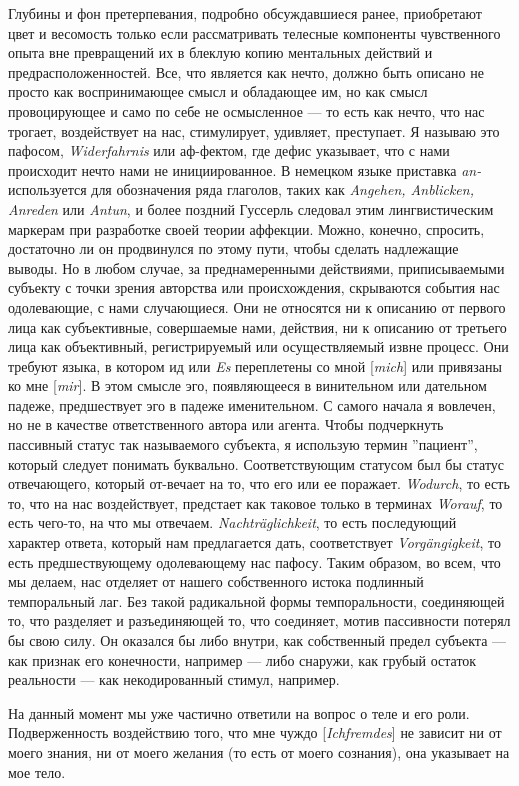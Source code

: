 \documentclass[12pt]{book}
\begin{document}
Глубины и фон претерпевания, подробно обсуждавшиеся ранее, приобретают цвет и весомость только если рассматривать телесные компоненты чувственного опыта вне превращений их в блеклую копию ментальных действий и предрасположенностей. Все, что является как нечто, должно быть описано не просто как воспринимающее смысл и обладающее им, но как смысл провоцирующее и само по себе не осмысленное --- то есть как нечто, что нас трогает, воздействует на нас, стимулирует, удивляет, преступает. Я называю это пафосом, \textit{Widerfahrnis} или аф-фектом, где дефис указывает, что с нами происходит нечто нами не инициированное. В немецком языке приставка \textit{an-} используется для обозначения ряда глаголов, таких как \textit{Angehen, Anblicken, Anreden} или \textit{Antun}, и более поздний Гуссерль следовал этим лингвистическим маркерам при разработке своей теории аффекции. Можно, конечно, спросить, достаточно ли он продвинулся по этому пути, чтобы сделать надлежащие выводы. Но в любом случае, за преднамеренными действиями, приписываемыми субъекту с точки зрения авторства или происхождения, скрываются события нас одолевающие, с нами случающиеся. Они не относятся ни к описанию от первого лица как субъективные, совершаемые нами, действия, ни к описанию от третьего лица как объективный, регистрируемый или осуществляемый извне процесс. Они требуют языка, в котором ид или \textit{Es} переплетены со мной [\textit{mich}] или привязаны ко мне [\textit{mir}]. В этом смысле эго, появляющееся в винительном или дательном падеже, предшествует эго в падеже именительном. С самого начала я вовлечен, но не в качестве ответственного автора или агента. Чтобы подчеркнуть пассивный статус так называемого субъекта, я использую термин ''пациент'', который следует понимать буквально. Соответствующим статусом был бы статус отвечающего, который от-вечает на то, что его или ее поражает. \textit{Wodurch}, то есть то, что на нас воздействует, предстает как таковое только в терминах \textit{Worauf}, то есть чего-то, на что мы отвечаем. \textit{Nachträglichkeit}, то есть последующий характер ответа, который нам предлагается дать, соответствует \textit{Vorgängigkeit}, то есть предшествующему одолевающему нас пафосу. Таким образом, во всем, что мы делаем, нас отделяет от нашего собственного истока подлинный темпоральный лаг. Без такой радикальной формы темпоральности, соединяющей то, что разделяет и разъединяющей то, что соединяет, мотив пассивности потерял бы свою силу. Он оказался бы либо внутри, как собственный предел субъекта --- как признак его конечности, например --- либо снаружи, как грубый остаток реальности --- как некодированный стимул, например.

На данный момент мы уже частично ответили на вопрос о теле и его роли. Подверженность воздействию того, что мне чуждо [\textit{Ichfremdes}] не зависит ни от моего знания, ни от моего желания (то есть от моего сознания), она указывает на мое тело.
\end{document}
